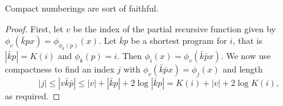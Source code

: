 \documentclass{style/llncs}
\begin{document}
{\begin{lemma}
Compact numberings are sort of faithful.
\end{lemma}
\begin{proof}
First, let $v$ be the index of the partial recursive function given by $\phi_v(\bar k p x)=\phi_{\phi_k(p)}(x)$. Let $\bar k p$ be a shortest program for $i$, that is $|\bar k p| = K(i)$ and $\phi_k(p)=i$. Then $\phi_i(x)=\phi_v(\bar k \bar p x)$. We now use compactness to find an index $j$ with $\phi_v(\bar k \bar p x)=\phi_j(x)$ and length
\[|j|\le |v\bar k\bar p|\le|v|+|\bar k p|+2\log|\bar k p|=K(i)+|v|+2\log K(i),\]
as required.
\end{proof}
}
\end{document}
